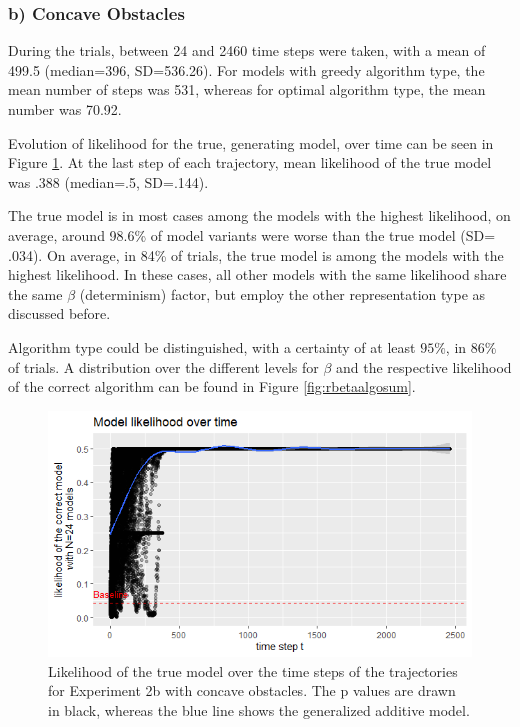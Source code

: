 \subsubsection*{b) Concave Obstacles}

During the trials, between 24 and 2460 time steps were taken, with a mean of 499.5 (median=396, SD=536.26).
For models with greedy algorithm type, the mean number of steps was 531, whereas for optimal algorithm type, the mean number was 70.92.

Evolution of likelihood for the true, generating model, over time can be seen in Figure \ref{fig:rtlikelihoodall}. At the last step of each trajectory, mean likelihood of the true model was .388 (median=.5, SD=.144).

The true model is in most cases among the models with the highest likelihood, on average, around 98.6\% of model variants were worse than the true model (SD= .034).
On average, in 84\% of trials, the true model is among the models with the highest likelihood.
In these cases, all other models with the same likelihood share the same $\beta$ (determinism) factor, but employ the other representation type as discussed before.


Algorithm type could be distinguished, with a certainty of at least $95\%$, in $86\%$ of trials.
A distribution over the different levels for $\beta$ and the respective likelihood of the correct algorithm can be found in Figure \ref{fig:rbetaalgosum}.


\begin{figure}
	\centering
	\includegraphics[width=0.95\linewidth]{../../statistics/R_concave_t_likelihoodall_points}
	\caption{Likelihood of the true model over the time steps of the trajectories for Experiment 2b with concave obstacles. The p values are drawn in black, whereas the blue line shows the generalized additive model.}
	\label{fig:rtlikelihoodall}
\end{figure}


